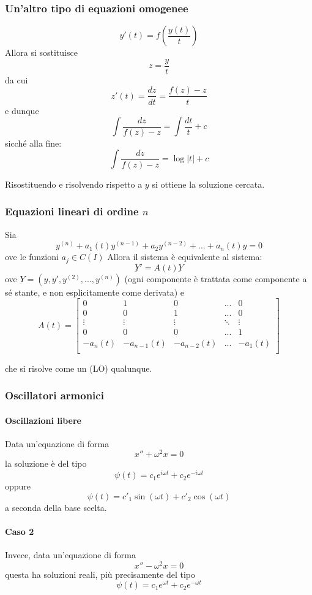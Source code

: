 \documentclass[a4paper,12pt]{article}
\begin{document}
\subsubsection{Un'altro tipo di equazioni omogenee}
$$y'(t) = f\left(\dfrac{y(t)}{t}\right)$$
Allora si sostituisce
$$z=\dfrac{y}{t}$$
da cui $$z'(t) = \dfrac{dz}{dt} = \dfrac{f(z)-z}{t}$$
e dunque
$$\int\dfrac{dz}{f(z)-z}=\int \dfrac{dt}{t} + c$$
sicché alla fine:
$$\int\dfrac{dz}{f(z)-z} = \log|t| + c$$

Risostituendo e risolvendo rispetto a $y$ si ottiene la soluzione cercata.

\subsubsection{Equazioni lineari di ordine $n$}
Sia
$$y^{(n)} + a_1(t)y^{(n-1)} + a_2y^{(n-2)} + ... + a_n(t)y = 0$$
ove le funzioni $a_j \in C(I)$
Allora il sistema è equivalente al sistema:
$$\underbar{Y}' = A(t)\underbar{Y}$$
ove $\underbar{Y}=(y, y', y^{(2)}, ..., y^{(n)})$ (ogni componente è trattata come componente a sé stante, e non esplicitamente come derivata) e
$$A(t) =
\begin{bmatrix}
0 & 1 & 0 & ... & 0\\
0 & 0 & 1 & ... & 0\\
\vdots & \vdots & \vdots & \ddots & \vdots \\
0 & 0 & 0 & ... & 1 \\
-a_n(t) & -a_{n-1}(t) & -a_{n-2}(t) & ... & -a_{1}(t) \\
\end{bmatrix}
$$

che si risolve come un (LO) qualunque.

\subsubsection{Oscillatori armonici}
\paragraph{Oscillazioni libere}
Data un'equazione di forma
$$x''+\omega^2 x=0$$
la soluzione è del tipo
$$\psi(t) = c_1 e^{i\omega t} + c_2 e^{-i\omega t}$$
oppure
$$\psi(t) = c'_1\sin(\omega t) + c'_2\cos(\omega t)$$
a seconda della base scelta.

\paragraph{Caso 2}
Invece, data un'equazione di forma
$$x''-\omega^2 x=0$$
questa ha soluzioni reali, più precisamente del tipo
$$\psi(t) = c_1 e^{\omega t} + c_2 e^{-\omega t}$$
\end{document}
